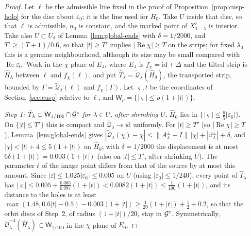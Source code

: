 \documentclass[11pt]{amsart}
\theoremstyle{definition}
\begin{document}
\begin{proof}
Let $\ell$ be the admissible line fixed in the proof of
Proposition~\ref{prop:cusp-holo} for the disc about $\varepsilon_0$; it is the line used for
$H_0$.  Take $U$ inside that disc, so that $\ell$ is admissible, $n_0$ is constant,
and the marked point of $X^\ell_{1-\lambda}$ is interior.  Take also $U\subset U_\delta$ of
Lemma~\ref{lem:global-ends} with $\delta=1/2000$, and $T'\ge(T+1)/0.6$, so that $|t|\ge T'$
implies $|\operatorname{Re}\chi|\ge T$ on the strips; for fixed $\lambda_0$ this is a genuine
neighbourhood, although its size may be small compared with $\operatorname{Re}\varepsilon_0$.  Work in the $\chi$-plane of $E_\lambda$, where $E_\lambda$ is $f_\chi=\mathrm{id}+\Delta$ and the
tilted strip is $\hat H_\lambda$ between $\ell$ and $f_\chi(\ell)$, and put
$\hat T_\lambda=\tilde{\mathcal Q}_\lambda(\hat H_0)$, the transported strip, bounded by $\Gamma=\tilde{\mathcal Q}_\lambda(\ell)$
and $f_\chi(\Gamma)$.  Let $\varsigma,t$ be the coordinates of Section~\ref{sec:cusp}
relative to $\ell$, and $\mathsf W_\rho=\{|\varsigma|\le\rho(1+|t|)\}$.

\emph{Step 1: $\hat T_\lambda\subset \mathsf W_{1/100}\cap\mathcal G^{\rm c}$ for $\lambda\in U$, after shrinking $U$.}
$\hat H_0$ lies in $\{|\varsigma|\le\tfrac65|\varepsilon_0|\}$.  On $\{|t|\le T'\}$ this is compact and
$\tilde{\mathcal Q}_\lambda\to\mathrm{id}$ uniformly.  For $|t|\ge T'$ (so $|\operatorname{Re}\chi|\ge T$),
Lemma~\ref{lem:global-ends} gives
$|\tilde{\mathcal Q}_\lambda(\chi)-\chi|\le\|A^\pm_\lambda-I\|\,|\chi|+|\vartheta^\pm_\lambda|+\delta$, and
$|\chi|<|t|+4\le5(1+|t|)$ on $\hat H_0$; with $\delta=1/2000$ the displacement is at most
$6\delta(1+|t|)=0.003(1+|t|)$ (also on $|t|\le T'$, after shrinking $U$).  The parameter
$t$ of the image point differs from that of the source by at most this amount.
Since $|\varepsilon|\le1.025|\varepsilon_0|\le0.005$ on $U$ (using $|\varepsilon_0|\le1/240$), every point of $\hat T_\lambda$ has
$|\varsigma|\le0.005+\tfrac{0.003}{0.997}(1+|t|)<0.0082(1+|t|)\le\tfrac1{100}(1+|t|)$, and its distance to the
holes is at least
$\max(1.48,0.6|t|-0.5)-0.003(1+|t|)\ge\tfrac1{20}(1+|t|)+\tfrac12+0.2$, so that the orbit
discs of Step~2, of radius $(1+|t|)/20$, stay in $\mathcal G^{\rm c}$.  Symmetrically,
$\tilde{\mathcal Q}_\lambda^{-1}(\hat H_\lambda)\subset \mathsf W_{1/100}$ in the $\chi$-plane of $E_0$.


\end{proof}
\end{document}
